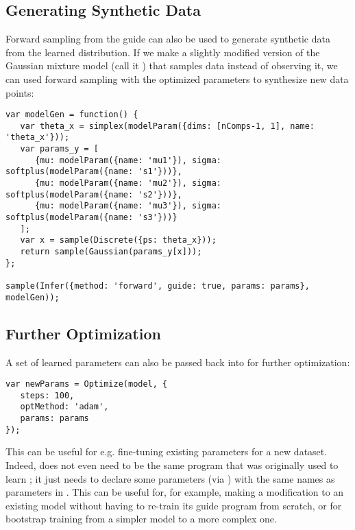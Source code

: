 \subsection{Generating Synthetic Data}

Forward sampling from the guide can also be used to generate synthetic data from the learned distribution. If we make a slightly modified version of the Gaussian mixture model (call it ) that samples data instead of observing it, we can used forward sampling with the optimized parameters  to synthesize new data points:
\begin{lstlisting}
var modelGen = function() {
   var theta_x = simplex(modelParam({dims: [nComps-1, 1], name: 'theta_x'}));
   var params_y = [
      {mu: modelParam({name: 'mu1'}), sigma: softplus(modelParam({name: 's1'}))},
      {mu: modelParam({name: 'mu2'}), sigma: softplus(modelParam({name: 's2'}))},
      {mu: modelParam({name: 'mu3'}), sigma: softplus(modelParam({name: 's3'}))}
   ];
   var x = sample(Discrete({ps: theta_x}));
   return sample(Gaussian(params_y[x]));
};

sample(Infer({method: 'forward', guide: true, params: params}, modelGen));
\end{lstlisting}

\subsection{Further Optimization}
\label{sec:furtherOptim}

A set of learned parameters  can also be passed back into  for further optimization:
\begin{lstlisting}
var newParams = Optimize(model, {
   steps: 100,
   optMethod: 'adam',
   params: params
});
\end{lstlisting}
This can be useful for e.g. fine-tuning existing parameters for a new dataset. Indeed,  does not even need to be the same program that was originally used to learn ; it just needs to declare some parameters (via ) with the same names as parameters in . This can be useful for, for example, making a modification to an existing model without having to re-train its guide program from scratch, or for bootstrap training from a simpler model to a more complex one.
